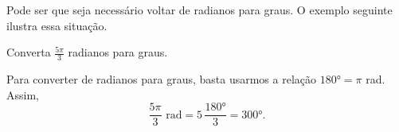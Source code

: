 Pode ser que seja necessário voltar de radianos para graus.
O exemplo seguinte ilustra essa situação.

\begin{example}
 Converta $\frac{5\pi}{3}$ radianos para graus.

 \solution
 Para converter de radianos para graus, basta usarmos a relação
 $\ang{180} = \pi$ rad. Assim,
 \[
   \frac{5\pi}{3}\text{ rad}
   = 5\,\frac{\ang{180}}{3}
   = \ang{300}.
 \]
\end{example}

